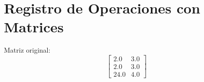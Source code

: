 \documentclass{article}%
\begin{document}
%
\normalsize%
\section{Registro de Operaciones con Matrices}%
\label{sec:RegistrodeOperacionesconMatrices}%
Matriz original:%
\[%
\begin{bmatrix} 2.0 & 3.0 \\ 2.0 & 3.0 \\ 24.0 & 4.0 \end{bmatrix}%
\]

%
\end{document}
